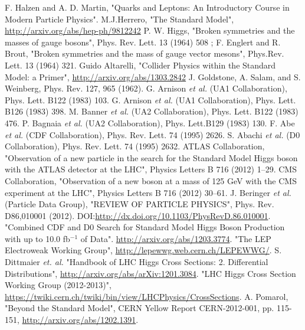 \begin{thebibliography}{99}
 F. Halzen and A. D. Martin, "Quarks and Leptons: An Introductory Course in Modern
Particle Physics".
 M.J.Herrero, "The Standard Model", {\url {http://arxiv.org/abs/hep-ph/9812242}}
 P. W. Higgs, "Broken symmetries and the masses of gauge bosons", Phys. Rev. Lett. 13 (1964) 508 ; F. Englert and R. Brout, "Broken symmetries and the mass of gauge vector mesons", Phys.Rev. Lett. 13 (1964) 321.
 Guido Altarelli, "Collider Physics within the Standard Model: a Primer", \url{http://arxiv.org/abs/1303.2842}
 {J. Goldstone}, A. Salam, and S. Weinberg, Phys. Rev. 127, 965 (1962).
 G. Arnison {\it et al.} (UA1 Collaboration), Phys. Lett. B122 (1983) 103.
 G. Arnison {\it et al.} (UA1 Collaboration), Phys. Lett. B126 (1983) 398.
 M. Banner {\it et al.} (UA2 Collaboration), Phys. Lett. B122 (1983) 476.
 P. Bagnaia {\it et al.} (UA2 Collaboration), Phys. Lett.B129 (1983) 130. 
 F. Abe {\it et al.} (CDF Collaboration), Phys. Rev. Lett. 74 (1995) 2626.
  S. Abachi {\it et al.} (D0 Collaboration), Phys. Rev. Lett. 74 (1995) 2632.
 ATLAS Collaboration, "Observation of a new particle in the search for the Standard Model Higgs boson
with the ATLAS detector at the LHC", Physics Letters B 716 (2012) 1–29.
 CMS Collaboration, "Observation of a new boson at a mass of 125 GeV with the CMS experiment at
the LHC", Physics Letters B 716 (2012) 30–61.
 J. Beringer {\it et al.} (Particle Data Group), "REVIEW OF PARTICLE PHYSICS", Phys. Rev. D86,010001 (2012).  DOI:\url{http://dx.doi.org/10.1103/PhysRevD.86.010001}.
 "Combined CDF and D0 Search for Standard Model Higgs Boson Production with up to 10.0 fb$^{−1}$ of Data". {\url{ http://arxiv.org/abs/1203.3774}}.
 "The LEP Electroweak Working Group", {\url {http://lepewwg.web.cern.ch/LEPEWWG/}}.
  S. Dittmaier {\it et. al.} "Handbook of LHC Higgs Cross Sections: 2. Differential Distributions", \url{http://arxiv.org/abs/arXiv:1201.3084}. 
 "LHC Higgs Cross Section Working Group (2012-2013)", {\url {https://twiki.cern.ch/twiki/bin/view/LHCPhysics/CrossSections}}.
 A. Pomarol, "Beyond the Standard Model", CERN Yellow Report CERN-2012-001, pp. 115-151, \url{http://arxiv.org/abs/1202.1391}.

\end{thebibliography}
